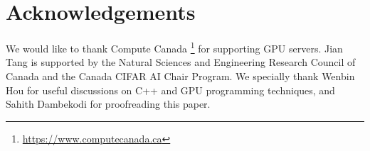 \documentclass[sigconf]{acmart}
\begin{document}
\nocite{newman2008distributed} \section*{Acknowledgements}

We would like to thank Compute Canada \footnote{\url{https://www.computecanada.ca}} for supporting GPU servers. Jian Tang is supported by the Natural Sciences and Engineering Research Council of Canada and the Canada CIFAR AI Chair Program. We specially thank Wenbin Hou for useful discussions on C++ and GPU programming techniques, and Sahith Dambekodi for proofreading this paper. 


\end{document}
